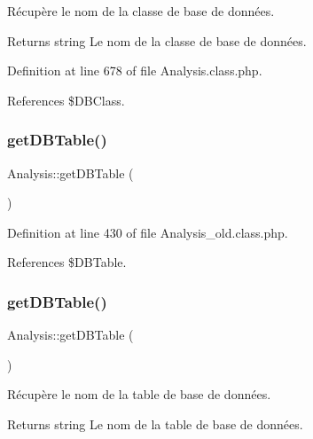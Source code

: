 Récupère le nom de la classe de base de données.

\begin{DoxyReturn}{Returns}
string Le nom de la classe de base de données. 
\end{DoxyReturn}


Definition at line 678 of file Analysis.\+class.\+php.



References \$\+D\+B\+Class.

\mbox{\label{class_analysis_aac54f4f73bcd61b1472f22e0dbd0ea46}} 
\subsubsection{\texorpdfstring{get\+D\+B\+Table()}{getDBTable()}\hspace{0.1cm}{\footnotesize\ttfamily [1/2]}}
{\footnotesize\ttfamily Analysis\+::get\+D\+B\+Table (\begin{DoxyParamCaption}{ }\end{DoxyParamCaption})}



Definition at line 430 of file Analysis\+\_\+old.\+class.\+php.



References \$\+D\+B\+Table.

\mbox{\label{class_analysis_aac54f4f73bcd61b1472f22e0dbd0ea46}} 
\subsubsection{\texorpdfstring{get\+D\+B\+Table()}{getDBTable()}\hspace{0.1cm}{\footnotesize\ttfamily [2/2]}}
{\footnotesize\ttfamily Analysis\+::get\+D\+B\+Table (\begin{DoxyParamCaption}{ }\end{DoxyParamCaption})}

Récupère le nom de la table de base de données.

\begin{DoxyReturn}{Returns}
string Le nom de la table de base de données. 
\end{DoxyReturn}


